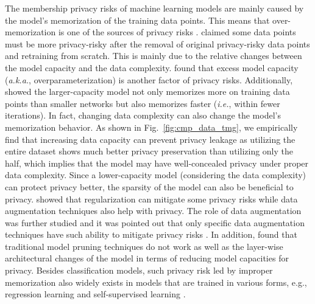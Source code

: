 The membership privacy risks of machine learning models are mainly caused by the model's memorization of the training data points. This means that over-memorization is one of the sources of privacy risks \cite{yeom2020overfitting}. \cite{carlini2022onion} claimed some data points must be more privacy-risky after the removal of original privacy-risky data points and retraining from scratch. This is mainly due to the relative changes between the model capacity and the data complexity.
\cite{tan2022parameters} found that excess model capacity (\textit{a.k.a.}, overparameterization) is another factor of privacy risks. Additionally, \cite{tan2023dimensionblessing} showed the larger-capacity model not only memorizes more on training data points than smaller networks but also memorizes faster (\emph{i.e.}, within fewer iterations). In fact, changing data complexity can also change the model's memorization behavior.
As shown in Fig.~\ref{fig:cmp_data_tmg}, we empirically find that increasing data capacity can prevent privacy leakage as utilizing the entire dataset shows much better privacy preservation than utilizing only the half, which implies that the model may have well-concealed privacy under proper data complexity. 
Since a lower-capacity model (considering the data complexity) can protect privacy better, the sparsity of the model can also be beneficial to privacy. \cite{kaya2020effectivenessregularizationmembership} showed that regularization can mitigate some privacy risks while data augmentation techniques also help with privacy. The role of data augmentation was further studied and it was pointed out that only specific data augmentation techniques have such ability to mitigate privacy risks \cite{kaya2021whendataaug,yu2021howdoesdataaug}. In addition, \cite{yuan2022miapruning} found that traditional model pruning techniques do not work as well as the layer-wise architectural changes of the model in terms of reducing model capacities for privacy.
Besides classification models, such privacy risk led by improper memorization also widely exists in models that are trained in various forms, e.g., regression learning \cite{tarun2023regression_ua} and self-supervised learning \cite{wang2024localizing}. 











